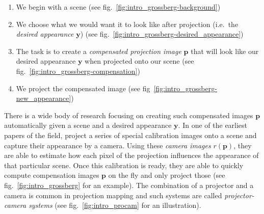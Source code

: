 \begin{enumerate}
    \item We begin with a scene (see fig.~\ref{fig:intro_grossberg-background})
    \item We choose what we would want it to look like after projection (i.e.~the \textit{desired appearance} \(\bm{y}\)) (see fig.~\ref{fig:intro_grossberg-desired_appearance})
    \item The task is to create a \textit{compensated projection image} \(\bm{p}\) that will look like our desired appearance \(\bm{y}\) when projected onto our scene (see fig.~\ref{fig:intro_grossberg-compensation})
    \item We project the compensated image (see fig~\ref{fig:intro_grossberg-new_appearance})
\end{enumerate}

There is a wide body of research focusing on creating such compensated images \(\bm{p}\) automatically given a scene and a desired appearance \(\bm{y}\). In one of the earliest papers of the field, \citet{Grossberg2004} project a series of special calibration images onto a scene and capture their appearance by a camera. Using these \textit{camera images} \(r(\bm{p})\), they are able to estimate how each pixel of the projection influences the appearance of that particular scene. Once this calibration is ready, they are able to quickly compute compensation images \(\bm{p}\) on the fly and only project those (see fig.~\ref{fig:intro_grossberg} for an example). The combination of a projector and a camera is common in projection mapping and such systems are called \textit{projector-camera systems} (see fig.~\ref{fig:intro_procam} for an illustration).

